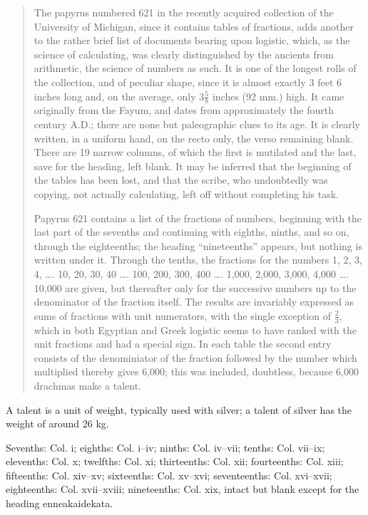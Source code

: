 \documentclass{article}
\newcommand{\Gk}[1]{\selectlanguage{polutonikogreek}#1\selectlanguage{english}}
\theoremstyle{definition}
\begin{document}
\begin{quote}
The papyrus numbered 621 in the recently acquired collection of the University of Michigan, since it contains tables of fractions, adds another to the rather brief list of documents
bearing upon logistic, which, as the science of calculating, was clearly distinguished by the ancients from arithmetic, the science of numbers as such. It is one of the longest rolls of
the collection, and of peculiar shape, since it is almost exactly 3 feet 6 inches long and, on the average, only $3\frac{5}{8}$ inches (92 mm.) high. It came originally from the Fayum, and dates from approximately the fourth century A.D.; there are none but paleographic clues to its age. It is clearly written, in a uniform hand, on the recto only, the verso remaining blank.
There are 19 narrow columns, of which the first is mutilated and the last, save for the heading, left blank. It may be inferred that the beginning of the tables has been lost, and that the scribe, who undoubtedly was copying, not actually calculating, left off without completing his task.

Papyrus 621 contains a list of the fractions of numbers, beginning with the last part of the sevenths and continuing with eighths, ninths, and so on, through the eighteenths; the
heading ``nineteenths'' appears, but nothing is written under it. Through the tenths, the fractions for the numbers 1, 2, 3, 4, \dots. 10, 20, 30, 40 \dots. 100, 200, 300, 400 \dots. 1,000, 2,000, 3,000, 4,000 \dots. 10,000 are given, but thereafter only for the successive numbers up to the denominator of the fraction itself. The results are invariably expressed as sums of fractions with unit numerators, with the single exception of $\frac{2}{3}$, which in both Egyptian and Greek logistic seems to have ranked with the unit fractions and had a special sign. In
each table the second entry consists of the denominiator of the fraction followed by the number which multiplied thereby gives 6,000; this was included, doubtless, because 6,000 drachmas make a talent.
\end{quote}

A talent is a unit of weight, typically used with silver; a talent of silver has the weight of around 26 kg. 

Sevenths: Col. i;
eighths: Col. i--iv;
ninths: Col. iv--vii;
tenths: Col. vii--ix;
elevenths: Col. x;
twelfths: Col. xi;
thirteenths: Col. xii;
fourteenths: Col. xiii;
fifteenths: Col. xiv--xv;
sixteenths: Col. xv--xvi;
seventeenths: Col. xvi--xvii;
eighteenths: Col. xvii--xviii;
nineteenths: Col. xix, intact but blank except for the heading \Gk{enneakaidekata}.
\end{document}
